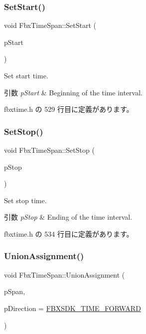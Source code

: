 \subsubsection{\texorpdfstring{Set\+Start()}{SetStart()}}
{\footnotesize\ttfamily void Fbx\+Time\+Span\+::\+Set\+Start (\begin{DoxyParamCaption}\item[{\hyperlink{class_fbx_time}{Fbx\+Time}}]{p\+Start }\end{DoxyParamCaption})\hspace{0.3cm}{\ttfamily [inline]}}

Set start time. 
\begin{DoxyParams}{引数}
{\em p\+Start} & Beginning of the time interval. \\
\hline
\end{DoxyParams}


 fbxtime.\+h の 529 行目に定義があります。

\mbox{\label{class_fbx_time_span_a7b0577b88300d141657ed2092228c867}} 
\subsubsection{\texorpdfstring{Set\+Stop()}{SetStop()}}
{\footnotesize\ttfamily void Fbx\+Time\+Span\+::\+Set\+Stop (\begin{DoxyParamCaption}\item[{\hyperlink{class_fbx_time}{Fbx\+Time}}]{p\+Stop }\end{DoxyParamCaption})\hspace{0.3cm}{\ttfamily [inline]}}

Set stop time. 
\begin{DoxyParams}{引数}
{\em p\+Stop} & Ending of the time interval. \\
\hline
\end{DoxyParams}


 fbxtime.\+h の 534 行目に定義があります。

\mbox{\label{class_fbx_time_span_af5159fe30c3baa37728c12ac167a28ba}} 
\subsubsection{\texorpdfstring{Union\+Assignment()}{UnionAssignment()}}
{\footnotesize\ttfamily void Fbx\+Time\+Span\+::\+Union\+Assignment (\begin{DoxyParamCaption}\item[{const \hyperlink{class_fbx_time_span}{Fbx\+Time\+Span} \&}]{p\+Span,  }\item[{int}]{p\+Direction = {\ttfamily \hyperlink{fbxtime_8h_aa80e034e7196b05b47f7bc58a5e2ce49}{F\+B\+X\+S\+D\+K\+\_\+\+T\+I\+M\+E\+\_\+\+F\+O\+R\+W\+A\+RD}} }\end{DoxyParamCaption})}

